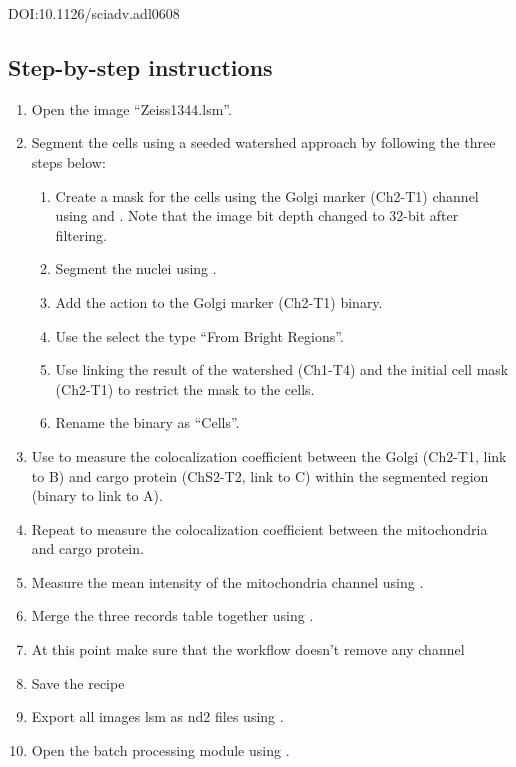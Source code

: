 DOI:10.1126/sciadv.adl0608

\subsection{Step-by-step instructions}
\begin{enumerate}
    \item Open the image ``Zeiss1344.lsm''.
    \item Segment the cells using a seeded watershed approach by following the three steps below:
    \begin{enumerate}
        \item Create a mask for the cells using the Golgi marker (Ch2-T1) channel using  and  . Note that the image bit depth changed to 32-bit after filtering.
        \item Segment the nuclei using  .
        \item Add the action  to the Golgi marker (Ch2-T1) binary. 
        \item Use the  select the type ``From Bright Regions''. 
        \item Use  linking the result of the watershed (Ch1-T4) and the initial cell mask (Ch2-T1) to restrict the mask to the cells.
        \item Rename the binary as ``Cells''.
    \end{enumerate}
    \item Use  to measure the colocalization coefficient between the Golgi (Ch2-T1, link to B) and cargo protein (ChS2-T2, link to C) within the segmented region (binary to link to A). 
    \item Repeat to measure the colocalization coefficient between the mitochondria and cargo protein.
    \item Measure the mean intensity of the mitochondria channel using .
    \item Merge the three records table together using .
    \item At this point make sure that the workflow doesn't remove any channel
    \item Save the recipe
    \item Export all images lsm as nd2 files using .
    \item Open the batch processing module using .
\end{enumerate}
